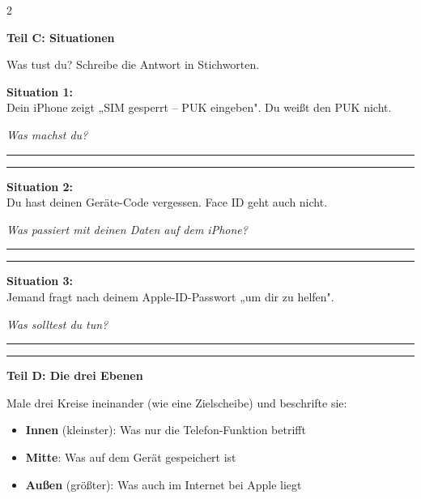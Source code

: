 \documentclass[a4paper,landscape,11pt]{article}
\begin{document}
\begin{multicols}{2}
\columnbreak

\textbf{\large Teil C: Situationen}

Was tust du? Schreibe die Antwort in Stichworten.

\vspace{3mm}

\textbf{Situation 1:}\\
Dein iPhone zeigt „SIM gesperrt -- PUK eingeben". Du weißt den PUK nicht.

\textit{Was machst du?}
\vspace{8mm}

\rule{\linewidth}{0.4pt}
\vspace{5mm}

\rule{\linewidth}{0.4pt}

\vspace{5mm}

\textbf{Situation 2:}\\
Du hast deinen Geräte-Code vergessen. Face ID geht auch nicht.

\textit{Was passiert mit deinen Daten auf dem iPhone?}
\vspace{8mm}

\rule{\linewidth}{0.4pt}
\vspace{5mm}

\rule{\linewidth}{0.4pt}

\vspace{5mm}

\textbf{Situation 3:}\\
Jemand fragt nach deinem Apple-ID-Passwort „um dir zu helfen".

\textit{Was solltest du tun?}
\vspace{8mm}

\rule{\linewidth}{0.4pt}
\vspace{5mm}

\rule{\linewidth}{0.4pt}

\vspace{8mm}

\textbf{\large Teil D: Die drei Ebenen}

Male drei Kreise ineinander (wie eine Zielscheibe) und beschrifte sie:

\begin{itemize}
\item \textbf{Innen} (kleinster): Was nur die Telefon-Funktion betrifft
\item \textbf{Mitte}: Was auf dem Gerät gespeichert ist
\item \textbf{Außen} (größter): Was auch im Internet bei Apple liegt
\end{itemize}

\end{multicols}
\end{document}

